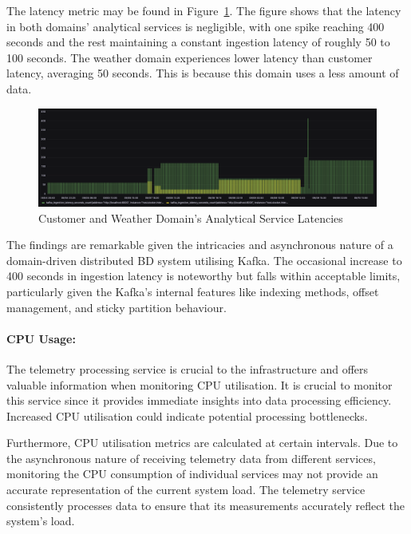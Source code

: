 \documentclass[journal]{IEEEtran}
\begin{document}
The latency metric may be found in Figure~\ref{cusetomerAndWeatherDomainAnalyaticalServicesLatencies}. The figure shows that the latency in both domains' analytical services is negligible, with one spike reaching 400 seconds and the rest maintaining a constant ingestion latency of roughly 50 to 100 seconds. The weather domain experiences lower latency than customer latency, averaging 50 seconds. This is because this domain uses a less amount of data.

\begin{figure}[h]
  \centering
  \includegraphics[width=\textwidth]{images/customer-and-weather-domain-analytics-service-latency.png}
  \caption{Customer and Weather Domain's Analytical Service Latencies}
  \label{cusetomerAndWeatherDomainAnalyaticalServicesLatencies}
\end{figure}

The findings are remarkable given the intricacies and asynchronous nature of a domain-driven distributed BD system utilising Kafka. The occasional increase to 400 seconds in ingestion latency is noteworthy but falls within acceptable limits, particularly given the Kafka's internal features like indexing methods, offset management, and sticky partition behaviour.

\paragraph{CPU Usage:} \label{cpuUsageInS1}   

The telemetry processing service is crucial to the infrastructure and offers valuable information when monitoring CPU utilisation. It is crucial to monitor this service since it provides immediate insights into data processing efficiency. Increased CPU utilisation could indicate potential processing bottlenecks. 

Furthermore, CPU utilisation metrics are calculated at certain intervals. Due to the asynchronous nature of receiving telemetry data from different services, monitoring the CPU consumption of individual services may not provide an accurate representation of the current system load. The telemetry service consistently processes data to ensure that its measurements accurately reflect the system's load. 
\end{document}

